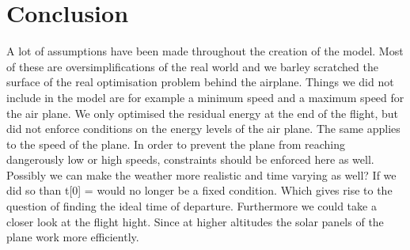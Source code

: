 \section{Conclusion}
A lot of assumptions have been made throughout the creation of the model. Most of these are oversimplifications of the real world and we barley scratched the surface of the real optimisation problem behind the airplane. 
Things we did not include in the model are for example a minimum speed
and a maximum speed for the air plane. We only optimised the residual energy at the end of the flight, but did not enforce conditions on the energy levels of the air plane. The same applies to the speed of the plane. In order to prevent the plane from reaching dangerously low or high speeds, constraints should be enforced here as well. Possibly we can make the weather more realistic and time varying as well? If we did so than t[0] = would no longer be a fixed condition. Which gives rise to the question of finding the ideal time of departure. Furthermore we could take a closer look at the flight hight. Since at higher altitudes the solar panels of the plane work more efficiently. 


